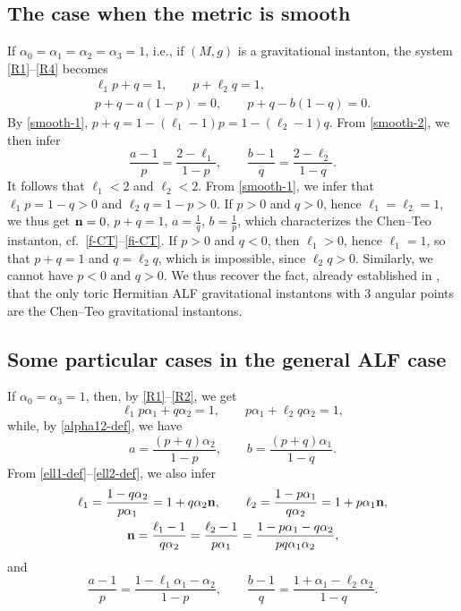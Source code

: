 \documentclass[pdftex]{sigma}
\numberwithin{equation}{section}
\begin{document}
\subsection{The case when the metric is smooth} \label{ss-smooth} If $\alpha _0 = \alpha _1 = \alpha _2 = \alpha _3 = 1$, i.e., if $(M, g)$ is a gravitational instanton, the system \eqref{R1}--\eqref{R4} becomes
\begin{gather} \ell _1 p + q = 1, \qquad p + \ell _2 q = 1, \label{smooth-1}\\
 p + q - a (1 - p) = 0, \qquad p + q - b (1 - q) = 0. \label{smooth-2}\end{gather}
By \eqref{smooth-1}, $p + q = 1 - (\ell _1 - 1) p = 1 - (\ell _2 - 1) q$. From \eqref{smooth-2}, we then infer
\[\frac{a - 1}{p} = \frac{2 - \ell _1}{1 - p}, \qquad \frac{b - 1}{q} = \frac{2 - \ell _2}{1 - q}. \]
It follows that $\ell _1 < 2$ and $\ell _2 < 2$. From \eqref{smooth-1}, we infer that $\ell _1 p = 1 - q > 0$ and $\ell _2 q = 1 - p > 0$. If $p > 0$ and $q > 0$, hence $\ell _1 = \ell _2 = 1$, we thus get ${\bf n} = 0$, $p + q = 1$, $a = \frac{1}{q}$, $b = \frac{1}{p}$, which characterizes the Chen--Teo instanton, cf.\ \eqref{f-CT}--\eqref{fi-CT}.
If $p > 0$ and $q < 0$, then $\ell _1 > 0$, hence $\ell _1 = 1$, so that $p + q = 1$ and $q = \ell _2 q$, which is impossible, since $\ell _2 q > 0$. Similarly, we cannot have $p < 0$ and $q > 0$. We thus recover the fact, already established in \cite[Section~7]{BG}, that the only toric Hermitian ALF gravitational instantons with 3 angular points are the Chen--Teo gravitational instantons.

\subsection{Some particular cases in the general ALF case} \label{sec:some-part-cases}

 If $\alpha _0 = \alpha _3 = 1$, then, by \eqref{R1}--\eqref{R2}, we get
\[ \ell _1 p \alpha _1 + q \alpha _2 = 1, \qquad p \alpha _1 + \ell _2 q \alpha _2 = 1, \]
while, by \eqref{alpha12-def}, we have
\[ a = \frac{(p + q) \alpha _2}{1 - p}, \qquad b = \frac{(p + q) \alpha _1}{1 - q}. \]
From \eqref{ell1-def}--\eqref{ell2-def}, we also infer
\begin{gather*} \ell _1 = \frac{1 - q \alpha _2}{p \alpha _1} = 1 + q \alpha _2 {\bf n}, \qquad \ell _2 = \frac{1 - p \alpha _1}{q \alpha _2} = 1 + p \alpha _1 {\bf n}, \\
 {\bf n} = \frac{\ell _1 - 1}{q \alpha _2} = \frac{\ell _2 - 1}{p \alpha _1} = \frac{1 - p \alpha _1 - q \alpha _2}{p q \alpha _1 \alpha _2}, \end{gather*}
and\
\[ \frac{a - 1}{p} = \frac{1 - \ell _1 \alpha _1 - \alpha _2}{1 - p}, \qquad \frac{b - 1}{q} = \frac{1 + \alpha _1 - \ell _2 \alpha _2}{1 - q}. \]
\end{document}
